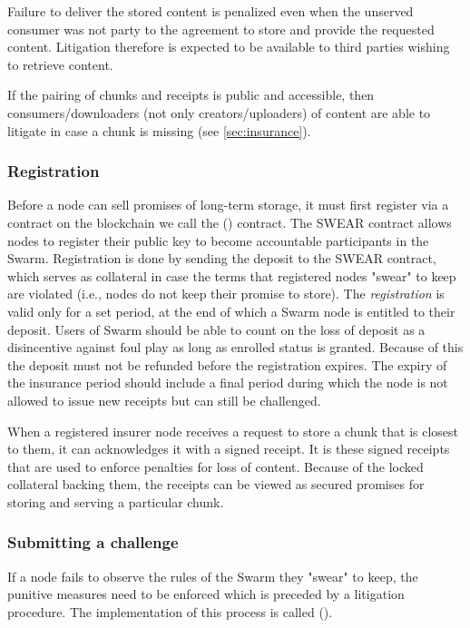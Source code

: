 Failure to deliver the stored content is penalized even when the unserved consumer was not party to the agreement to store and provide the requested content. Litigation therefore is expected to be available to third parties wishing to retrieve content.

If the pairing of chunks and receipts is public and accessible, then consumers/downloaders (not only creators/uploaders) of content are able to litigate in case a chunk is missing (see \ref{sec:insurance}). 

\subsubsection{Registration}

Before a node can sell promises of long-term storage, it must first register via a contract on the blockchain we call the  () contract. The SWEAR contract allows nodes to register their public key to become accountable participants in the Swarm. Registration is done by sending the deposit to the SWEAR contract, which serves as collateral in case the terms that registered nodes "swear" to keep are violated (i.e., nodes do not keep their promise to store). The \emph{registration} is valid only for a set period, at the end of which a Swarm node is entitled to their deposit. Users of Swarm should be able to count on the loss of deposit as a disincentive against foul play as long as enrolled status is granted. Because of this the deposit must not be refunded before the registration expires. The expiry of the insurance period should include a final period  during which the node is not allowed to issue new receipts but can still be challenged.

When a registered insurer node receives a request to store a chunk that is closest to them, it can acknowledges it with a signed receipt. It is these signed receipts that are used to enforce penalties for loss of content. Because of the locked collateral backing them, the receipts can be viewed as secured promises for storing and serving a particular chunk.



\subsubsection{Submitting a challenge}


If a node fails to observe the rules of the Swarm they "swear" to keep, the punitive measures need to be enforced which is preceded by a litigation procedure. The implementation of this process is called  ().

